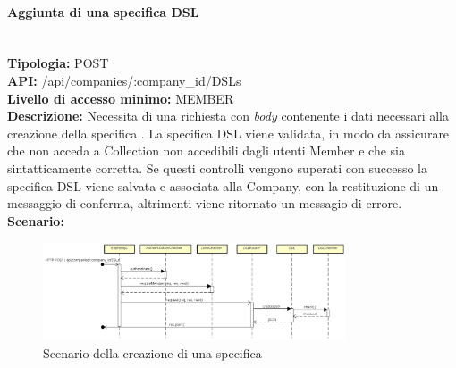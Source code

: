 \newpage
\paragraph{Aggiunta di una specifica DSL}\mbox{}\\
\textbf{Tipologia:} POST \\
\textbf{API:} /api/companies/:company\_id/DSLs \\
\textbf{Livello di accesso minimo:} MEMBER \\
\textbf{Descrizione:} Necessita di una richiesta con \textit{body} contenente i dati necessari alla creazione della specifica . La specifica DSL viene validata, in modo da assicurare che non acceda a Collection non accedibili dagli utenti Member e che sia sintatticamente corretta. Se questi controlli vengono superati con successo la specifica DSL viene salvata e associata alla Company, con la restituzione di un messaggio di conferma, altrimenti viene ritornato un messagio di errore. \\
\textbf{Scenario:} 
\begin{figure}[H]
\centering
\includegraphics[width=0.8\textwidth]{res/sections/backend/sequence/(POST)dsl.png}
\caption{Scenario della creazione di una specifica }
\end{figure}

\newpage
